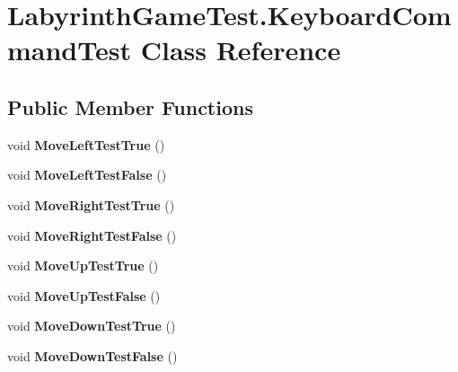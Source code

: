 \hypertarget{class_labyrinth_game_test_1_1_keyboard_command_test}{\section{Labyrinth\+Game\+Test.\+Keyboard\+Command\+Test Class Reference}
\label{class_labyrinth_game_test_1_1_keyboard_command_test}
}
\subsection*{Public Member Functions}
\begin{DoxyCompactItemize}
\item 
\hypertarget{class_labyrinth_game_test_1_1_keyboard_command_test_a15a97ba94d8e954a76502662e87bdfbe}{void {\bfseries Move\+Left\+Test\+True} ()}\label{class_labyrinth_game_test_1_1_keyboard_command_test_a15a97ba94d8e954a76502662e87bdfbe}

\item 
\hypertarget{class_labyrinth_game_test_1_1_keyboard_command_test_af2473b77e1565c5998a88cd38b7937ae}{void {\bfseries Move\+Left\+Test\+False} ()}\label{class_labyrinth_game_test_1_1_keyboard_command_test_af2473b77e1565c5998a88cd38b7937ae}

\item 
\hypertarget{class_labyrinth_game_test_1_1_keyboard_command_test_ab0995b8fd2fb9a85233f03b5403b1a26}{void {\bfseries Move\+Right\+Test\+True} ()}\label{class_labyrinth_game_test_1_1_keyboard_command_test_ab0995b8fd2fb9a85233f03b5403b1a26}

\item 
\hypertarget{class_labyrinth_game_test_1_1_keyboard_command_test_a2dbc192d1afd3f2d1cf5f4f6e9700999}{void {\bfseries Move\+Right\+Test\+False} ()}\label{class_labyrinth_game_test_1_1_keyboard_command_test_a2dbc192d1afd3f2d1cf5f4f6e9700999}

\item 
\hypertarget{class_labyrinth_game_test_1_1_keyboard_command_test_a00ffdb95cc681c794ee636e4706e765a}{void {\bfseries Move\+Up\+Test\+True} ()}\label{class_labyrinth_game_test_1_1_keyboard_command_test_a00ffdb95cc681c794ee636e4706e765a}

\item 
\hypertarget{class_labyrinth_game_test_1_1_keyboard_command_test_a69bed30e43c07c451b80b3bbdbbffa85}{void {\bfseries Move\+Up\+Test\+False} ()}\label{class_labyrinth_game_test_1_1_keyboard_command_test_a69bed30e43c07c451b80b3bbdbbffa85}

\item 
\hypertarget{class_labyrinth_game_test_1_1_keyboard_command_test_a616a66be9bd48e07b873791177db8265}{void {\bfseries Move\+Down\+Test\+True} ()}\label{class_labyrinth_game_test_1_1_keyboard_command_test_a616a66be9bd48e07b873791177db8265}

\item 
\hypertarget{class_labyrinth_game_test_1_1_keyboard_command_test_abe676f9f1fbeba9b29903deeb82378a7}{void {\bfseries Move\+Down\+Test\+False} ()}\label{class_labyrinth_game_test_1_1_keyboard_command_test_abe676f9f1fbeba9b29903deeb82378a7}

\end{DoxyCompactItemize}
